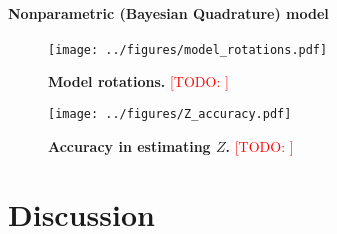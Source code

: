 \documentclass{article} %
\newcommand{\TODO}[1]{\textcolor{red}{[TODO: #1]}}
\begin{document}
\paragraph{Nonparametric (Bayesian Quadrature) model}



\begin{figure}[t]
  \centering
  \texttt{[image: ../figures/model\_rotations.pdf]}
  \caption{\textbf{Model rotations.} \TODO{}}
  \label{fig:rotations}
\end{figure}

\begin{figure}[t]
  \centering
  \texttt{[image: ../figures/Z\_accuracy.pdf]}
  \caption{\textbf{Accuracy in estimating $Z$.} \TODO{}}
  \label{fig:accuracy}
\end{figure}

\section{Discussion}


\renewcommand\refname{\normalsize{References}}


\end{document}
